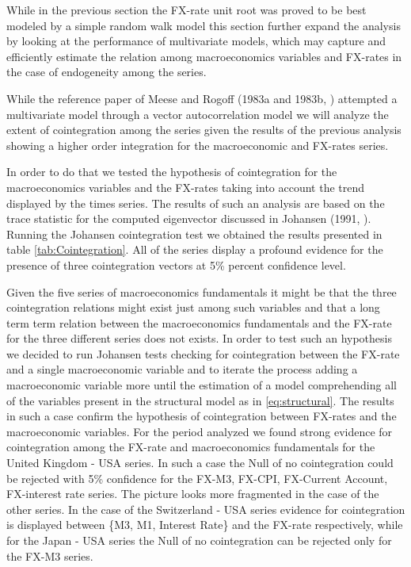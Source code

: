 While in the previous section the FX-rate unit root was proved to be best modeled by a simple random walk model this section further
expand the analysis by looking at the performance of multivariate models, which may capture and efficiently estimate the relation among
macroeconomics variables and FX-rates in the case of endogeneity among the series.

While the reference paper of Meese and Rogoff (1983a and 1983b, \cite{MeeseRogoffa, MeeseRogoffb}) attempted a multivariate model through
a vector autocorrelation model we will analyze the extent of cointegration among the series given the results of the previous analysis
showing a higher order integration for the macroeconomic and FX-rates series.

In order to do that we tested the hypothesis of cointegration for the macroeconomics variables and the FX-rates taking into account the
trend displayed by the times series. The results of such an analysis are based on the trace statistic for the computed eigenvector discussed in Johansen (1991,
\cite{Johansen}). Running the Johansen cointegration test we obtained the results presented in table \ref{tab:Cointegration}. All of
the series display a profound evidence for the presence of three cointegration vectors at 5\% percent confidence level.

Given the five series of macroeconomics fundamentals it might be that the three cointegration relations might exist just among such variables and that a
long term term relation between the macroeconomics fundamentals and the FX-rate for the three different series does not exists. In order to test
such an hypothesis we decided to run Johansen tests checking for cointegration between the FX-rate and a single macroeconomic variable and to
iterate the process adding a macroeconomic variable more until the estimation of a model comprehending all of the variables present in the
structural model as in \ref{eq:structural}. The results in such a case confirm the hypothesis of cointegration between FX-rates and the macroeconomic variables.
For the period analyzed we found strong evidence for cointegration among the FX-rate and macroeconomics fundamentals for the United Kingdom - USA series. In
such a case the Null of no cointegration could be rejected with 5\% confidence for the FX-M3, FX-CPI, FX-Current Account, FX-interest rate series.
The picture looks more fragmented in the case of the other series. In the case of the Switzerland - USA series evidence for cointegration is displayed
between \{M3, M1, Interest Rate\} and the FX-rate respectively, while for the Japan - USA series the Null of no cointegration can be rejected only for the FX-M3
series.

